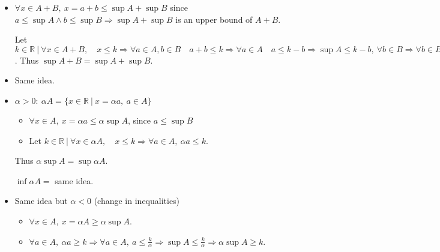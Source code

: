 \documentclass[12pt, a4paper]{book}
\begin{document}
\begin{itemize}
  \item $\forall x\in A+B,\ x=a+b \leq \sup A + \sup B$ since $a\leq \sup A \wedge b\leq\sup B \Rightarrow \sup A+ \sup B$ is an upper bound of $A+B$.

  Let $k \in\mathbb{R}\ |\ \forall x\in A+B, \quad x\leq k \Rightarrow \forall a\in A, b\in B \quad a+b\leq k \Rightarrow \forall a\in A\quad a\leq k-b \Rightarrow \sup A \leq k-b,\ \forall b\in B \Rightarrow \forall b\in B, b \leq k-\sup A \Rightarrow \sup B \leq k - \sup A \Rightarrow \sup A + \sup B \leq k$.
  Thus $\sup A+B = \sup A + \sup B$.
  \item Same idea.
  \item $\alpha > 0:\ \alpha A = \{x\in\mathbb{R}\ |\ x=\alpha a,\ a\in A\}$
  \begin{itemize}
    \item $\forall x\in A,\ x=\alpha a \leq \alpha \sup A$, since $a\leq \sup B$
    \item Let $k\in\mathbb{R}\ |\ \forall x\in \alpha A, \quad x\leq k \Rightarrow \forall a\in A,\ \alpha a\leq k$.
  \end{itemize}
  Thus $\alpha \sup A = \sup \alpha A$.

  $\inf \alpha A =$ same idea.
  \item Same idea but $\alpha < 0$ (change in inequalities)
  \begin{itemize}
    \item $\forall x\in A,\ x=\alpha A \geq \alpha \sup A$.
    \item $\forall a\in A,\ \alpha a\geq k \Rightarrow \forall a\in A,\ a\leq \frac{k}{\alpha} \Rightarrow \sup A\leq \frac{k}{\alpha} \Rightarrow \alpha \sup A \geq k$.
  \end{itemize}
\end{itemize}
\end{document}
